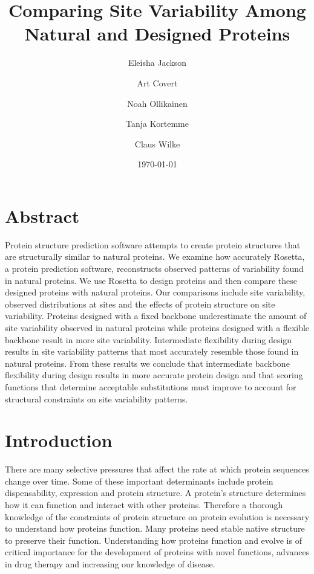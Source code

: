 \documentclass[12pt]{article}
\title{Comparing Site Variability Among Natural and Designed Proteins}
\author{Eleisha Jackson \and Art Covert \and Noah Ollikainen \and Tanja Kortemme \and Claus Wilke}
\begin{document}
\date{\today}
\maketitle

\section{Abstract}
\label{Abstract}
Protein structure prediction software attempts to create protein structures that are structurally similar to natural proteins. We examine how accurately Rosetta, a protein prediction software, reconstructs observed patterns of variability found in natural proteins. We use Rosetta to design proteins and then compare these designed proteins with natural proteins. Our comparisons include site variability, observed distributions at sites and the effects of protein structure on site variability. Proteins designed with a fixed backbone underestimate the amount of site variability observed in natural proteins while proteins designed with a flexible backbone result in more site variability. Intermediate flexibility during design results in site variability patterns that most accurately resemble those found in natural proteins. From these results we conclude that intermediate backbone flexibility during design results in more accurate protein design and that scoring functions that determine acceptable substitutions must improve to account for structural constraints on site variability patterns.

\section{Introduction}
\label{Introduction}

There are many selective pressures that affect the rate at which protein sequences change over time. Some of these important determinants include protein dispensability, expression and protein structure. A protein's structure determines how it can function and interact with other proteins.  Therefore a thorough knowledge of the constraints of protein structure on protein evolution is necessary to understand how proteins function. Many proteins need stable native structure to preserve their function. Understanding how proteins function and evolve is of critical importance for the development of proteins with novel functions, advances in drug therapy and increasing our knowledge of disease.  
\end{document}
